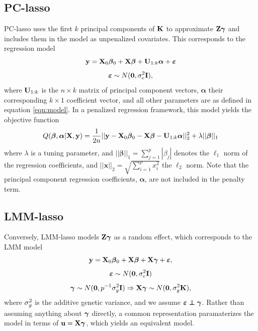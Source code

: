 \subsection{PC-lasso}
PC-lasso uses the first $k$ principal components of $\mathbf{K}$ to approximate $\mathbf{Z}\boldsymbol{\gamma}$ and includes them in the model as unpenalized covariates. This corresponds to the regression model
\begin{equation}
    \label{eqn:pca_reg}
    \mathbf{y} = \mathbf{X}_0\boldsymbol{\beta}{}_0 + \mathbf{X}\boldsymbol{\beta}{} + \mathbf{U}_{1:k}\boldsymbol{\alpha} + \boldsymbol{\varepsilon}{} 
\end{equation}
$$ \boldsymbol{\varepsilon}{} \sim N(\boldsymbol{0}, \sigma^2_e \mathbf{I}), $$
where $\mathbf{U}_{1:k}$ is the $n \times k$ matrix of principal component vectors, $\boldsymbol{\alpha}$ their corresponding $k \times 1$ coefficient vector, and all other parameters are as defined in equation \eqref{eqn:model}. In a penalized regression framework, this model yields the objective function
\begin{equation}
    \label{eqn:pca_obj}
    Q(\boldsymbol{\beta}{}, \boldsymbol{\alpha}|\mathbf{X}, \mathbf{y}) = \frac{1}{2n} ||\mathbf{y} - \mathbf{X}_0\boldsymbol{\beta}{}_0 - \mathbf{X} \boldsymbol{\beta}{}- \mathbf{U}_{1:k}\boldsymbol{\alpha}||_2^2 + \lambda || \boldsymbol{\beta}{} ||_1
\end{equation}
where $\lambda$ is a tuning parameter, and $|| \boldsymbol{\beta} ||_1 = \sum_{j=1}^p |\beta_j|$ denotes the $\ell_1$ norm of the regression coefficients, and $||\mathbf{x}||_2 = \sqrt{\sum_{i=1}^p x_i^2}$ the $\ell_2$ norm. Note that the principal component regression coefficients, $\boldsymbol{\alpha}$, are not included in the penalty term. 

\subsection{LMM-lasso}
\label{sec:lmmlasso}

Conversely, LMM-lasso models $\mathbf{Z}\boldsymbol{\gamma}$ as a random effect, which corresponds to the LMM model
\begin{equation}
    \label{eqn:lmm_reg}
    \mathbf{y} = \mathbf{X}_0\boldsymbol{\beta}{}_0 + \mathbf{X}\boldsymbol{\beta}{} + \mathbf{X}\boldsymbol{\gamma}+ \boldsymbol{\varepsilon}{},
\end{equation}
$$ \boldsymbol{\varepsilon}{} \sim N(\boldsymbol{0}, \sigma^2_e \mathbf{I}) $$
$$ \boldsymbol{\gamma} \sim N(\boldsymbol{0}, p^{-1} \sigma^2_g \mathbf{I}) \Rightarrow \mathbf{X} \boldsymbol{\gamma} \sim N(\boldsymbol{0}, \sigma^2_g \mathbf{K}), $$
where $\sigma^2_g$ is the additive genetic variance, and we assume $\beps \independent \bgamma$. Rather than assuming anything about $\boldsymbol{\gamma}$ directly, a common representation paramaterizes the model in terms of $\mathbf{u}=\mathbf{X}\boldsymbol{\gamma}$, which yields an equivalent model. 

